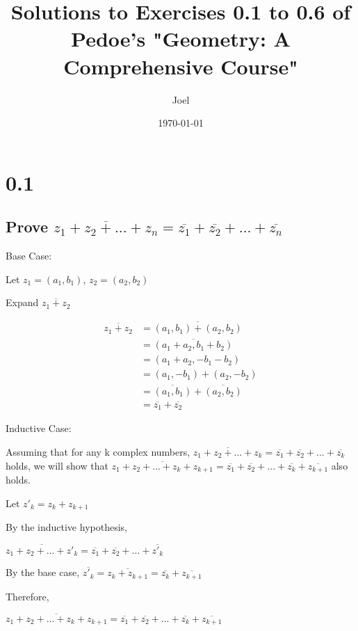 \documentclass[11pt]{article}
\author{Joel}
\date{\today}
\title{Solutions to Exercises 0.1 to 0.6 of Pedoe's "Geometry: A Comprehensive Course"}
\begin{document}
\maketitle

\section*{0.1}
\label{sec:orge4f8cf0}
\subsection*{Prove \(\overline{z_1 + z_2 + ... + z_n} = \overline{z_1} + \overline{z_2} + ... + \overline{z_n}\)}
\label{sec:orgcb15ff6}
Base Case:

Let \(z_1 = (a_1, b_1)\), \(z_2 = (a_2, b_2)\)

Expand \(\overline{z_1 + z_2}\)

\begin{align*} 
\overline{z_1 + z_2} &= \overline{(a_1, b_1) + (a_2, b_2)} \\
                     &= \overline{(a_1 + a_2, b_1 + b_2)} \\
                     &= (a_1 + a_2, -b_1 - b_2) \\
		     &= (a_1, -b_1) + (a_2, -b_2) \\
		     &= \overline{(a_1, b_1)} + \overline{(a_2, b_2)} \\
		     &= \overline{z_1} + \overline{z_2}
\end{align*}

Inductive Case:

Assuming that for any k complex numbers, \(\overline{z_1 + z_2 + ... + z_k} = \overline{z_1} + \overline{z_2} + ... + \overline{z_k}\) holds, we will show that \(\overline{z_1 + z_2 + ... + z_k + z_{k+1}} = \overline{z_1} + \overline{z_2} + ... + \overline{z_k} + \overline{z_{k+1}}\) also holds. 

Let \(z'_k = z_k + z_{k+1}\)

By the inductive hypothesis,

\(\overline{z_1 + z_2 + ... + z'_k} = \overline{z_1} + \overline{z_2} + ... + \overline{z'_k}\)

By the base case, \(\overline{z'_k} = \overline{z_k + z_{k+1}} = \overline{z_k} + \overline{z_{k+1}}\)

Therefore,

\(\overline{z_1 + z_2 + ... + z_k + z_{k+1}} = \overline{z_1} + \overline{z_2} + ... + \overline{z_k} + \overline{z_{k+1}}\)
\end{document}
